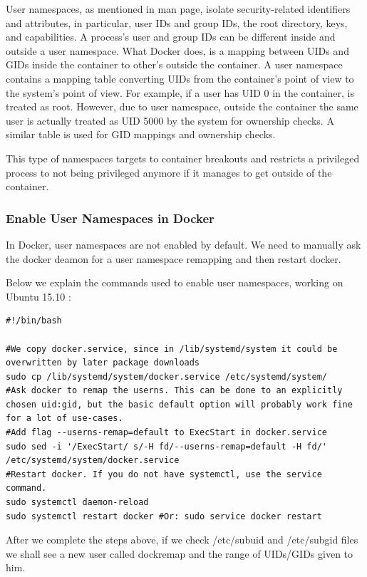 User namespaces, as mentioned in man page, isolate security-related identifiers and attributes, in particular, user IDs and group IDs, the root directory, keys, and capabilities. A process's user and group IDs can be different inside and outside a user namespace. 
What Docker does, is a mapping between UIDs and GIDs inside the container to other's outside the container. A user namespace contains a mapping table converting UIDs from the container's point of view to the system's point of view. For example, if a user has UID 0 in the container, is treated as root. However, due to user namespace, outside the container the same user is actually treated as UID 5000 by the system for ownership checks. A similar table is used for GID mappings and ownership checks.

This type of namespaces targets to container breakouts and restricts a privileged process to not being privileged anymore if it manages to get outside of the container.

\subsubsection{Enable User Namespaces in Docker}
In Docker, user namespaces are not enabled by default. We need to manually ask the docker deamon for a user namespace remapping and then restart docker.

Below we explain the commands used to enable user namespaces, working on Ubuntu 15.10 \cite{raesene_userns} : 

\begin{lstlisting}[style=bashscript, caption={Script to enable user namespaces}]
#!/bin/bash

#We copy docker.service, since in /lib/systemd/system it could be overwritten by later package downloads
sudo cp /lib/systemd/system/docker.service /etc/systemd/system/
#Ask docker to remap the userns. This can be done to an explicitly chosen uid:gid, but the basic default option will probably work fine for a lot of use-cases.
#Add flag --userns-remap=default to ExecStart in docker.service
sudo sed -i '/ExecStart/ s/-H fd/--userns-remap=default -H fd/' /etc/systemd/system/docker.service
#Restart docker. If you do not have systemctl, use the service command.
sudo systemctl daemon-reload
sudo systemctl restart docker #Or: sudo service docker restart
\end{lstlisting}

After we complete the steps above, if we check /etc/subuid and /etc/subgid files we shall see a new user called dockremap and the range of UIDs/GIDs given to him.

